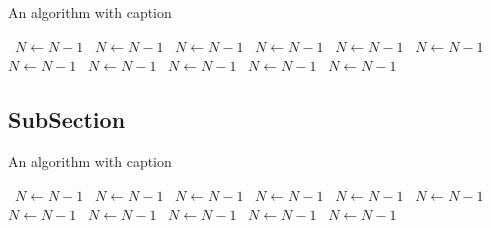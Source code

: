 \documentclass[a4paper]{article}
\begin{document}
\begin{algorithm}
\caption{An algorithm with caption}
\begin{algorithmic}
\    \State $N \gets N - 1$
\    \State $N \gets N - 1$
\    \State $N \gets N - 1$
\    \State $N \gets N - 1$
\    \State $N \gets N - 1$
\    \State $N \gets N - 1$
\    \State $N \gets N - 1$
\    \State $N \gets N - 1$
\    \State $N \gets N - 1$
\    \State $N \gets N - 1$
\    \State $N \gets N - 1$
\EndWhile
\end{algorithmic}
\end{algorithm}

\subsection{SubSection}

\begin{algorithm}
\caption{An algorithm with caption}
\begin{algorithmic}
\    \State $N \gets N - 1$
\    \State $N \gets N - 1$
\    \State $N \gets N - 1$
\    \State $N \gets N - 1$
\    \State $N \gets N - 1$
\    \State $N \gets N - 1$
\    \State $N \gets N - 1$
\    \State $N \gets N - 1$
\    \State $N \gets N - 1$
\    \State $N \gets N - 1$
\    \State $N \gets N - 1$
\EndWhile
\end{algorithmic}
\end{algorithm}
\end{document}
